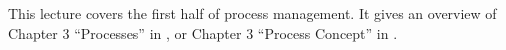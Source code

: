This lecture covers the first half of process management.
It gives an overview of Chapter 3 ``Processes'' in 
\cite{Silberschatz2013intl,Silberschatz2013osc}, or Chapter 3 ``Process 
Concept'' in \cite{Silberschatz2009osc}.
